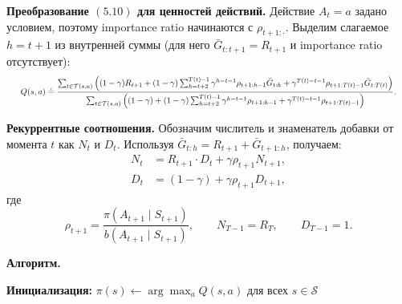 \begin{solution}
    \textbf{Преобразование $(5.10)$ для ценностей действий.}
    Действие $A_t = a$ задано условием, поэтому importance ratio начинаются с $\rho_{t+1:\cdot}$. Выделим слагаемое $h = t+1$ из внутренней суммы (для него $\bar{G}_{t:t+1} = R_{t+1}$ и importance ratio отсутствует):
    \[
    \resizebox{0.97\linewidth}{!}{$\displaystyle Q(s,a) \doteq \frac{\sum_{t \in \mathcal{T}(s,a)} \left((1-\gamma) R_{t+1} + (1-\gamma)\sum_{h=t+2}^{T(t)-1} \gamma^{h-t-1} \rho_{t+1:h-1} \bar{G}_{t:h} + \gamma^{T(t)-t-1} \rho_{t+1:T(t)-1} \bar{G}_{t:T(t)}\right)}{\sum_{t \in \mathcal{T}(s,a)} \left((1-\gamma) + (1-\gamma)\sum_{h=t+2}^{T(t)-1} \gamma^{h-t-1} \rho_{t+1:h-1} + \gamma^{T(t)-t-1} \rho_{t+1:T(t)-1}\right)}. $}
    \]

    \textbf{Рекуррентные соотношения.}
    Обозначим числитель и знаменатель добавки от момента $t$ как $N_t$ и $D_t$. Используя $\bar{G}_{t:h} = R_{t+1} + \bar{G}_{t+1:h}$, получаем:
    \[
    \begin{aligned}
    N_t &= R_{t+1} \cdot D_t + \gamma \rho_{t+1} N_{t+1}, \\
    D_t &= (1-\gamma) + \gamma \rho_{t+1} D_{t+1},
    \end{aligned}
    \]
    где
    \[
    \rho_{t+1} = \frac{\pi(A_{t+1}\mid S_{t+1})}{b(A_{t+1}\mid S_{t+1})},
    \qquad N_{T-1} = R_T, \qquad D_{T-1} = 1.
    \]

    \noindent\textbf{Алгоритм.}
    \par\noindent
    \begin{algorithm}[H]
        \DontPrintSemicolon
        \SetAlgoLined
        \BlankLine
        \textbf{Инициализация:}\;
        $\pi(s) \leftarrow \arg\max_a Q(s,a)$ для всех $s \in \mathcal{S}$\;
        \BlankLine
    \end{algorithm}
\end{solution}

